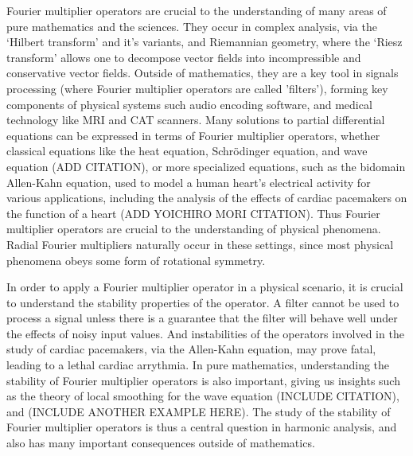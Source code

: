 \documentclass[12pt]{article}
\theoremstyle{plain}
\theoremstyle{remark}
\theoremstyle{definition}
\begin{document}
Fourier multiplier operators are crucial to the understanding of many areas of pure mathematics and the sciences. They occur in complex analysis, via the `Hilbert transform' and it's variants, and Riemannian geometry, where the `Riesz transform' allows one to decompose vector fields into incompressible and conservative vector fields. Outside of mathematics, they are a key tool in signals processing (where Fourier multiplier operators are called 'filters'), forming key components of physical systems such audio encoding software, and medical technology like MRI and CAT scanners. Many solutions to partial differential equations can be expressed in terms of Fourier multiplier operators, whether classical equations like the heat equation, Schr\"{o}dinger equation, and wave equation (ADD CITATION), or more specialized equations, such as the bidomain Allen-Kahn equation, used to model a human heart's electrical activity for various applications, including the analysis of the effects of cardiac pacemakers on the function of a heart (ADD YOICHIRO MORI CITATION). Thus Fourier multiplier operators are crucial to the understanding of physical phenomena. Radial Fourier multipliers naturally occur in these settings, since most physical phenomena obeys some form of rotational symmetry.


In order to apply a Fourier multiplier operator in a physical scenario, it is crucial to understand the stability properties of the operator. A filter cannot be used to process a signal unless there is a guarantee that the filter will behave well under the effects of noisy input values. And instabilities of the operators involved in the study of cardiac pacemakers, via the Allen-Kahn equation, may prove fatal, leading to a lethal cardiac arrythmia. In pure mathematics, understanding the stability of Fourier multiplier operators is also important, giving us insights such as the theory of local smoothing for the wave equation (INCLUDE CITATION), and (INCLUDE ANOTHER EXAMPLE HERE). The study of the stability of Fourier multiplier operators is thus a central question in harmonic analysis, and also has many important consequences outside of mathematics.
\end{document}
